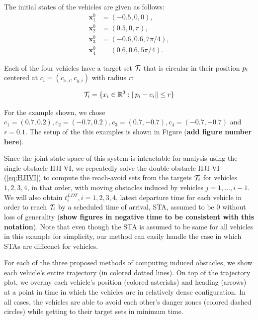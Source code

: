 The initial states of the vehicles are given as follows:
\begin{equation}
\begin{aligned}
\bm{x}_1^0 &= (-0.5, 0, 0), \\
\bm{x}_2^0 &= (0.5, 0, \pi), \\
\bm{x}_3^0 &= \left(-0.6, 0.6, 7\pi/4\right), \\
\bm{x}_4^0 &= \left(0.6, 0.6, 5\pi/4\right).\
\end{aligned}
\end{equation}

\noindent Each of the four vehicles have a target set $\mathcal{T}_i$ that is circular in their position $p_i$ centered at $c_i = (c_{x,i}, c_{y,i})$ with radius $r$:

\begin{equation}
\mathcal{T}_i = \{x_i \in \mathbb{R}^3: \|p_i - c_i\| \le r\}
\end{equation}

\noindent For the example shown, we chose $c_1 = (0.7, 0.2), c_2 = (-0.7, 0.2), c_3 = (0.7, -0.7), c_4 = (-0.7, -0.7)$ and $r = 0.1$. The setup of the this examples is shown in Figure (\textbf{add figure number here}).

Since the joint state space of this system is intractable for analysis using the single-obstacle HJI VI, we repeatedly solve the double-obstacle HJI VI (\ref{eq:HJIVI}) to compute the reach-avoid sets from the targets $\mathcal{T}_i$ for vehicles $1,2,3,4$, in that order, with moving obstacles induced by vehicles $j=1,\ldots,i-1$. We will also obtain $t_i^{LDT},i=1,2,3,4$, latest departure time for each vehicle in order to reach $\mathcal{T}_i$ by a scheduled time of arrival, STA, assumed to be $0$ without loss of generality (\textbf{show figures in negative time to be consistent with this notation}). Note that even though the STA is assumed to be same for all vehicles in this example for simplicity, our method can easily handle the case in which STAs are diffeenet for vehicles.

For each of the three proposed methods of computing induced obstacles, we show each vehicle's entire trajectory (in colored dotted lines). On top of the trajectory plot, we overlay each vehicle's position (colored asterisks) and heading (arrows) at a point in time in which the vehicles are in relatively dense configuration. In all cases, the vehicles are able to avoid each other's danger zones (colored dashed circles) while getting to their target sets in minimum time.

